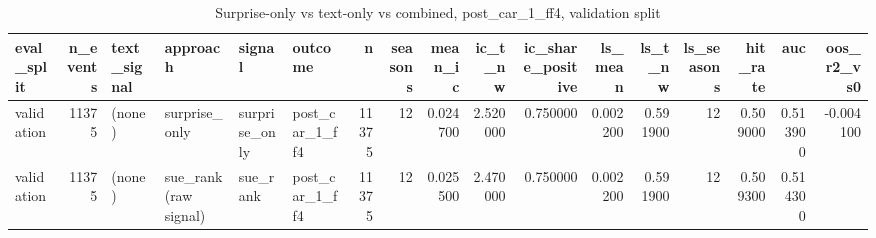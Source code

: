 \begin{table}
\caption{Surprise-only vs text-only vs combined, post_car_1_ff4, validation split}
\label{tab:t7_compare__post_car_1_ff4__validation}
\begin{tabular}{lrllllrrrrrrrrrrr}
\toprule
eval\_split & n\_events & text\_signal & approach & signal & outcome & n & seasons & mean\_ic & ic\_t\_nw & ic\_share\_positive & ls\_mean & ls\_t\_nw & ls\_seasons & hit\_rate & auc & oos\_r2\_vs0 \\
\midrule
validation & 11375 & (none) & surprise\_only & surprise\_only & post\_car\_1\_ff4 & 11375 & 12 & 0.024700 & 2.520000 & 0.750000 & 0.002200 & 0.591900 & 12 & 0.509000 & 0.513900 & -0.004100 \\
validation & 11375 & (none) & sue\_rank (raw signal) & sue\_rank & post\_car\_1\_ff4 & 11375 & 12 & 0.025500 & 2.470000 & 0.750000 & 0.002200 & 0.591900 & 12 & 0.509300 & 0.514300 &  \\
\bottomrule
\end{tabular}
\end{table}
